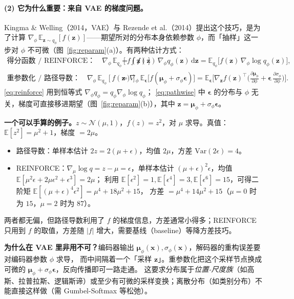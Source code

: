 \documentclass[a4paper,fontset=none,zihao=5]{ctexart}
\numberwithin{equation}{section}
\newcommand{\x}{\mathbf{x}}
\newcommand{\N}{\mathcal{N}}
\newcommand{\eps}{\boldsymbol{\epsilon}}
\newcommand{\E}{\mathbb{E}}
\begin{document}
\paragraph{(2) 它为什么重要：来自 VAE 的梯度问题。}
Kingma \& Welling（2014，VAE）与 Rezende et al.（2014）提出这个技巧，是为了计算
$\nabla_\phi\,\E_{\mathbf{z}\sim q_\phi}[f(\mathbf{z})]$——期望所对的分布本身依赖参数 $\phi$，而「抽样」这一步对 $\phi$ 不可微（图~\ref{fig:reparam}(a)）。有两种估计方式：
\begin{align}
  \text{得分函数 / REINFORCE：}\quad
  \nabla_\phi\,\E_{q_\phi}[f(\mathbf{z})]
  &=\int f(\mathbf{z})\,\nabla_\phi q_\phi(\mathbf{z})\,\mathrm{d}\mathbf{z}
   =\E_{q_\phi}\!\big[f(\mathbf{z})\,\nabla_\phi\log q_\phi(\mathbf{z})\big], \label{eq:reinforce}\\
  \text{重参数化 / 路径导数：}\quad
  \nabla_\phi\,\E_{q_\phi}[f(\mathbf{z})]
  &=\nabla_\phi\,\E_{\eps}\big[f(\boldsymbol{\mu}_\phi+\sigma_\phi\eps)\big]
   =\E_{\eps}\Big[\nabla_{\mathbf{z}}f(\mathbf{z})^\top\Big(\frac{\partial\boldsymbol{\mu}_\phi}{\partial\phi}+\eps\,\frac{\partial\sigma_\phi}{\partial\phi}\Big)\Big]. \label{eq:pathwise}
\end{align}
\eqref{eq:reinforce} 用到恒等式 $\nabla_\phi q_\phi=q_\phi\nabla_\phi\log q_\phi$；
\eqref{eq:pathwise} 中 $\eps$ 的分布与 $\phi$ 无关，梯度可直接移进期望（图~\ref{fig:reparam}(b)），其中 $\mathbf{z}=\boldsymbol{\mu}_\phi+\sigma_\phi\eps$。

\textbf{一个可以手算的例子。}$z\sim\N(\mu,1)$，$f(z)=z^2$，对 $\mu$ 求导。真值：$\E[z^2]=\mu^2+1$，梯度 $=2\mu$。
\begin{itemize}[leftmargin=1.6em,itemsep=1pt]
  \item 路径导数：单样本估计 $2z=2(\mu+\epsilon)$，均值 $2\mu$，方差 $\mathrm{Var}(2\epsilon)=4$。
  \item REINFORCE：$\nabla_\mu\log q=z-\mu=\epsilon$，单样本估计 $(\mu+\epsilon)^2\epsilon$，均值 $\E[\mu^2\epsilon+2\mu\epsilon^2+\epsilon^3]=2\mu$；
        利用 $\E[\epsilon^2]=1,\E[\epsilon^4]=3,\E[\epsilon^6]=15$，可得二阶矩 $\E[(\mu+\epsilon)^4\epsilon^2]=\mu^4+18\mu^2+15$，
        方差 $=\mu^4+14\mu^2+15$（$\mu=0$ 时为 $15$，$\mu=2$ 时为 $87$）。
\end{itemize}
两者都无偏，但路径导数利用了 $f$ 的梯度信息，方差通常小得多；REINFORCE 只用到 $f$ 的取值，方差随 $|f|$ 增大，需要基线（baseline）等降方差技巧。

\begin{whybox}
\textbf{为什么在 VAE 里非用不可？}编码器输出 $\boldsymbol{\mu}_\phi(\x),\sigma_\phi(\x)$，解码器的重构误差要对编码器参数 $\phi$ 求导，
而中间隔着一个「采样 $\mathbf{z}$」。重参数化把这个采样节点换成可微的 $\boldsymbol{\mu}_\phi+\sigma_\phi\eps$，反向传播即可一路走通。
这要求分布属于\emph{位置-尺度族}（如高斯、拉普拉斯、逻辑斯谛）或至少有可微的采样变换；离散分布（如类别分布）不能直接这样做（需 Gumbel-Softmax 等松弛）。
\end{whybox}
\end{document}
